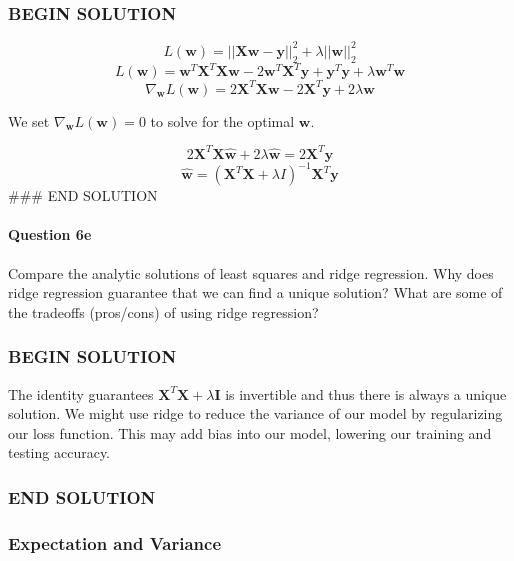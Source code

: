 \documentclass[11pt]{article}
\begin{document}
    \subsubsection{BEGIN SOLUTION}\label{begin-solution}

\[L(\textbf{w}) = ||\textbf{X}\textbf{w} - \textbf{y}||_2^2 + \lambda ||\textbf{w}||_2^2\]
\[L(\textbf{w}) = \textbf{w}^T \textbf{X}^T \textbf{X} \textbf{w} - 2 \textbf{w}^T \textbf{X}^T \textbf{y} + \textbf{y}^T \textbf{y} + \lambda \textbf{w}^T\textbf{w}\]
\[\nabla_\textbf{w} L(\textbf{w}) = 2\textbf{X}^T\textbf{X}\textbf{w} - 2\textbf{X}^T\textbf{y} + 2\lambda \textbf{w}\]

We set \(\nabla_\textbf{w} L(\textbf{w}) = 0\) to solve for the optimal
\(\textbf{w}\).

\[2\textbf{X}^T\textbf{X}\hat{\textbf{w}} + 2\lambda \hat{\textbf{w}} = 2\textbf{X}^T\textbf{y}\]
\[\hat{\textbf{w}} = (\textbf{X}^T\textbf{X} + \lambda I)^{-1}\textbf{X}^T\textbf{y}\]
\#\#\# END SOLUTION

    \paragraph{Question 6e}\label{question-6e}

Compare the analytic solutions of least squares and ridge regression.
Why does ridge regression guarantee that we can find a unique solution?
What are some of the tradeoffs (pros/cons) of using ridge regression?

    \subsubsection{BEGIN SOLUTION}\label{begin-solution}

The identity guarantees \(\textbf{X}^T\textbf{X} + \lambda \textbf{I}\)
is invertible and thus there is always a unique solution. We might use
ridge to reduce the variance of our model by regularizing our loss
function. This may add bias into our model, lowering our training and
testing accuracy.

\subsubsection{END SOLUTION}\label{end-solution}

    \subsubsection{Expectation and Variance}\label{expectation-and-variance}
\end{document}
